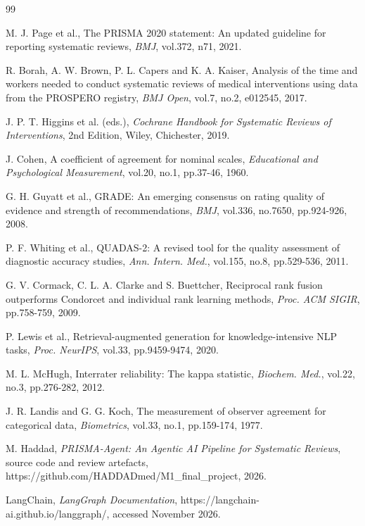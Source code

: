 \documentclass[12pt,a4paper]{article}
\begin{document}
\begin{thebibliography}{99}

 M. J. Page et al., The PRISMA 2020 statement: An updated guideline for
reporting systematic reviews, \textit{BMJ}, vol.372, n71, 2021.

 R. Borah, A. W. Brown, P. L. Capers and K. A. Kaiser, Analysis of the time and
workers needed to conduct systematic reviews of medical interventions using data from the
PROSPERO registry, \textit{BMJ Open}, vol.7, no.2, e012545, 2017.

 J. P. T. Higgins et al. (eds.), \textit{Cochrane Handbook for Systematic
Reviews of Interventions}, 2nd Edition, Wiley, Chichester, 2019.

 J. Cohen, A coefficient of agreement for nominal scales, \textit{Educational
and Psychological Measurement}, vol.20, no.1, pp.37-46, 1960.

 G. H. Guyatt et al., GRADE: An emerging consensus on rating quality of evidence
and strength of recommendations, \textit{BMJ}, vol.336, no.7650, pp.924-926, 2008.

 P. F. Whiting et al., QUADAS-2: A revised tool for the quality assessment of
diagnostic accuracy studies, \textit{Ann. Intern. Med.}, vol.155, no.8, pp.529-536, 2011.

 G. V. Cormack, C. L. A. Clarke and S. Buettcher, Reciprocal rank fusion
outperforms Condorcet and individual rank learning methods, \textit{Proc. ACM SIGIR},
pp.758-759, 2009.

 P. Lewis et al., Retrieval-augmented generation for knowledge-intensive NLP
tasks, \textit{Proc. NeurIPS}, vol.33, pp.9459-9474, 2020.

 M. L. McHugh, Interrater reliability: The kappa statistic, \textit{Biochem.
Med.}, vol.22, no.3, pp.276-282, 2012.

 J. R. Landis and G. G. Koch, The measurement of observer agreement for
categorical data, \textit{Biometrics}, vol.33, no.1, pp.159-174, 1977.

 M. Haddad, \textit{PRISMA-Agent: An Agentic AI Pipeline for Systematic Reviews},
source code and review artefacts, https://github.com/HADDADmed/M1\_final\_project, 2026.

 LangChain, \textit{LangGraph Documentation},
https://langchain-ai.github.io/langgraph/, accessed November 2026.


\end{thebibliography}
\end{document}
